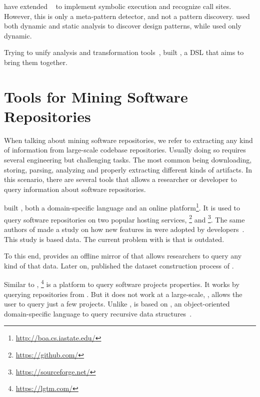 \cite{posnett_thex:_2010} have extended \asm{}~\cite{bruneton_asm:_2002,kuleshov_using_2007} to implement symbolic execution and recognize call sites. 
However, this is only a meta-pattern detector, and not a pattern discovery. 
\cite{hu_dynamic_2008} used both dynamic and static analysis to discover design patterns, while \cite{arcelli_design_2008} used only dynamic. 

Trying to unify analysis and transformation tools~\cite{vinju_how_2006}, \cite{klint_rascal:_2009} built \rascal, a DSL that aims to bring them together.  

\section{Tools for Mining Software Repositories} \label{sec:rw:mining}

When talking about mining software repositories, we refer to extracting any kind of information from large-scale codebase repositories. 
Usually doing so requires several engineering but challenging tasks. 
The most common being downloading, storing, parsing, analyzing and properly extracting different kinds of artifacts. 
In this scenario, there are several tools that allows a researcher or developer to query information about software repositories. 

\cite{dyer_boa:_2013,dyer_declarative_2013} built \boa{}, both a domain-specific language and an online platform\footnote{\url{http://boa.cs.iastate.edu/}}. 
It is used to query software repositories on two popular hosting services, \github \footnote{\url{https://github.com/}} and \sourceforge \footnote{\url{https://sourceforge.net/}}. 
The same authors of \boa{} made a study on how new features in \java{} were adopted by developers~\cite{dyer_mining_2014}. 
This study is based \sourceforge{} data. 
The current problem with \sourceforge{} is that is outdated. 

To this end, \cite{gousios_ghtorent_2013} provides an offline mirror of \github{} that allows researchers to query any kind of that data. 
Later on, \cite{gousios_lean_2014} published the dataset construction process of \github{}. 

Similar to \boa{}, \lgtm \footnote{\url{https://lgtm.com/}} is a platform to query software projects properties. 
It works by querying repositories from \github{}. 
But it does not work at a large-scale, \ie{}, \lgtm{} allows the user to query just a few projects. 
Unlike \boa{}, \lgtm{} is based on \ql{}, an object-oriented domain-specific language to query recursive data structures~\cite{avgustinov_ql:_2016}. 

